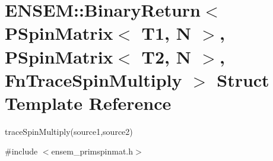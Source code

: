 \hypertarget{structENSEM_1_1BinaryReturn_3_01PSpinMatrix_3_01T1_00_01N_01_4_00_01PSpinMatrix_3_01T2_00_01N_01fe1ad0c4fbb2ea3b6d703682cfed6045}{}\section{E\+N\+S\+EM\+:\+:Binary\+Return$<$ P\+Spin\+Matrix$<$ T1, N $>$, P\+Spin\+Matrix$<$ T2, N $>$, Fn\+Trace\+Spin\+Multiply $>$ Struct Template Reference}
\label{structENSEM_1_1BinaryReturn_3_01PSpinMatrix_3_01T1_00_01N_01_4_00_01PSpinMatrix_3_01T2_00_01N_01fe1ad0c4fbb2ea3b6d703682cfed6045}


trace\+Spin\+Multiply(source1,source2)  




{\ttfamily \#include $<$ensem\+\_\+primspinmat.\+h$>$}

